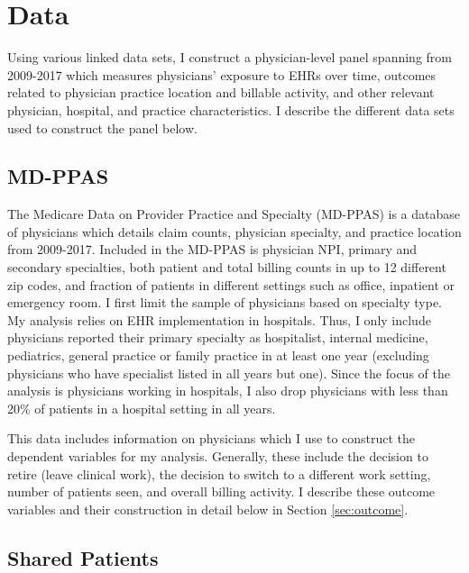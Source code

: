 \documentclass[11pt]{article}
\begin{document}
\section{Data}

Using various linked data sets, I construct a physician-level panel spanning from 2009-2017 which measures physicians' exposure to EHRs over time, outcomes related to physician practice location and billable activity, and other relevant physician, hospital, and practice characteristics. I describe the different data sets used to construct the panel below.

\subsection{MD-PPAS}

The Medicare Data on Provider Practice and Specialty (MD-PPAS) is a database of physicians which details claim counts, physician specialty, and practice location from 2009-2017. Included in the MD-PPAS is physician NPI, primary and secondary specialties, both patient and total billing counts in up to 12 different zip codes, and fraction of patients in different settings such as office, inpatient or emergency room. I first limit the sample of physicians based on specialty type. My analysis relies on EHR implementation in hospitals. Thus, I only include physicians reported their primary specialty as hospitalist, internal medicine, pediatrics, general practice or family practice in at least one year (excluding physicians who have specialist listed in all years but one). Since the focus of the analysis is physicians working in hospitals, I also drop physicians with less than 20\% of patients in a hospital setting in all years.

This data includes information on physicians which I use to construct the dependent variables for my analysis. Generally, these include the decision to retire (leave clinical work), the decision to switch to a different work setting, number of patients seen, and overall billing activity. I describe these outcome variables and their construction in detail below in Section \ref{sec:outcome}.


\subsection{Shared Patients}
\end{document}
